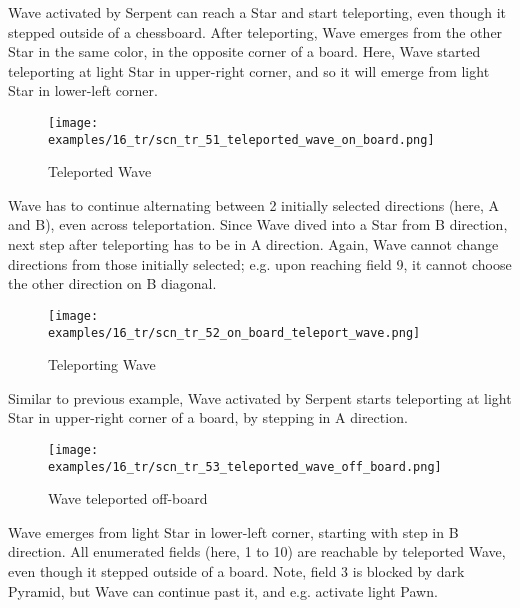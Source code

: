 Wave activated by Serpent can reach a Star and start teleporting, even
though it stepped outside of a chessboard. After teleporting, Wave emerges
from the other Star in the same color, in the opposite corner of a board.
Here, Wave started teleporting at light Star in upper-right corner, and
so it will emerge from light Star in lower-left corner.

\clearpage %

\vspace*{-1.0\baselineskip}
\noindent
\begin{figure}[!h]
\texttt{[image: examples/16\_tr/scn\_tr\_51\_teleported\_wave\_on\_board.png]}
\caption{Teleported Wave}
\label{fig:scn_tr_51_teleported_wave_on_board}
\end{figure}

Wave has to continue alternating between 2 initially selected directions (here,
A and B), even across teleportation. Since Wave dived into a Star from B direction,
next step after teleporting has to be in A direction. Again, Wave cannot change
directions from those initially selected; e.g. upon reaching field 9, it cannot
choose the other direction on B diagonal.

\clearpage %

\vspace*{-1.0\baselineskip}
\noindent
\begin{figure}[!h]
\texttt{[image: examples/16\_tr/scn\_tr\_52\_on\_board\_teleport\_wave.png]}
\caption{Teleporting Wave}
\label{fig:scn_tr_52_on_board_teleport_wave}
\end{figure}

Similar to previous example, Wave activated by Serpent starts teleporting at
light Star in upper-right corner of a board, by stepping in A direction.

\clearpage %

\vspace*{-1.0\baselineskip}
\noindent
\begin{figure}[!h]
\texttt{[image: examples/16\_tr/scn\_tr\_53\_teleported\_wave\_off\_board.png]}
\caption{Wave teleported off-board}
\label{fig:scn_tr_53_teleported_wave_off_board}
\end{figure}

Wave emerges from light Star in lower-left corner, starting with step in B
direction. All enumerated fields (here, 1 to 10) are reachable by teleported
Wave, even though it stepped outside of a board. Note, field 3 is blocked by
dark Pyramid, but Wave can continue past it, and e.g. activate light Pawn.


